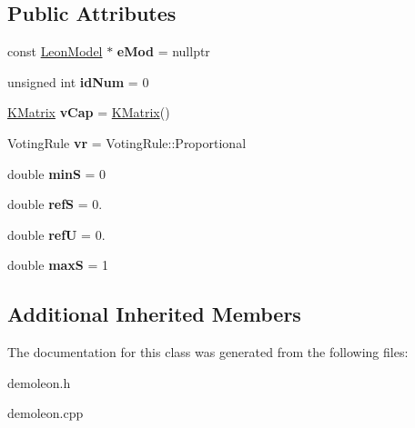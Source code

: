 \subsection*{Public Attributes}
\begin{DoxyCompactItemize}
\item 
\hypertarget{class_demo_leon_1_1_leon_actor_ac1d0763b54385d48548d4a3994b1d6c9}{const \hyperlink{class_demo_leon_1_1_leon_model}{Leon\-Model} $\ast$ {\bfseries e\-Mod} = nullptr}\label{class_demo_leon_1_1_leon_actor_ac1d0763b54385d48548d4a3994b1d6c9}

\item 
\hypertarget{class_demo_leon_1_1_leon_actor_ad1d4a3ecf9f2c2ed114e6e72b69b7aa0}{unsigned int {\bfseries id\-Num} = 0}\label{class_demo_leon_1_1_leon_actor_ad1d4a3ecf9f2c2ed114e6e72b69b7aa0}

\item 
\hypertarget{class_demo_leon_1_1_leon_actor_a7e4e109fc0a7fab6e6d746d8e2eba2b7}{\hyperlink{class_k_base_1_1_k_matrix}{K\-Matrix} {\bfseries v\-Cap} = \hyperlink{class_k_base_1_1_k_matrix}{K\-Matrix}()}\label{class_demo_leon_1_1_leon_actor_a7e4e109fc0a7fab6e6d746d8e2eba2b7}

\item 
\hypertarget{class_demo_leon_1_1_leon_actor_a7a24a56a17b7268a39512c767fc50b9a}{Voting\-Rule {\bfseries vr} = Voting\-Rule\-::\-Proportional}\label{class_demo_leon_1_1_leon_actor_a7a24a56a17b7268a39512c767fc50b9a}

\item 
\hypertarget{class_demo_leon_1_1_leon_actor_a0f213e2a30c168b43b5252cd9f9f6d09}{double {\bfseries min\-S} = 0}\label{class_demo_leon_1_1_leon_actor_a0f213e2a30c168b43b5252cd9f9f6d09}

\item 
\hypertarget{class_demo_leon_1_1_leon_actor_adacbdb6895cae65a8cc7c27f7d30e83e}{double {\bfseries ref\-S} = 0.}\label{class_demo_leon_1_1_leon_actor_adacbdb6895cae65a8cc7c27f7d30e83e}

\item 
\hypertarget{class_demo_leon_1_1_leon_actor_ac4cd6c70e04fc0a13f606386b0027ee2}{double {\bfseries ref\-U} = 0.}\label{class_demo_leon_1_1_leon_actor_ac4cd6c70e04fc0a13f606386b0027ee2}

\item 
\hypertarget{class_demo_leon_1_1_leon_actor_aaa19e5cda5bfc41c29c9d9e05f6995c4}{double {\bfseries max\-S} = 1}\label{class_demo_leon_1_1_leon_actor_aaa19e5cda5bfc41c29c9d9e05f6995c4}

\end{DoxyCompactItemize}
\subsection*{Additional Inherited Members}


The documentation for this class was generated from the following files\-:\begin{DoxyCompactItemize}
\item 
demoleon.\-h\item 
demoleon.\-cpp\end{DoxyCompactItemize}
